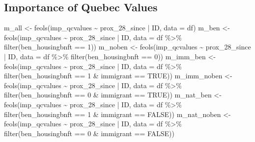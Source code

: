 \documentclass[
  letterpaper,
  DIV=11,
  numbers=noendperiod]{scrartcl}
\newenvironment{Shaded}{\begin{snugshade}}{\end{snugshade}}
\newcommand{\AttributeTok}[1]{\textcolor[rgb]{0.40,0.45,0.13}{#1}}
\newcommand{\ConstantTok}[1]{\textcolor[rgb]{0.56,0.35,0.01}{#1}}
\newcommand{\DecValTok}[1]{\textcolor[rgb]{0.68,0.00,0.00}{#1}}
\newcommand{\FunctionTok}[1]{\textcolor[rgb]{0.28,0.35,0.67}{#1}}
\newcommand{\NormalTok}[1]{\textcolor[rgb]{0.00,0.23,0.31}{#1}}
\newcommand{\OtherTok}[1]{\textcolor[rgb]{0.00,0.23,0.31}{#1}}
\newcommand{\SpecialCharTok}[1]{\textcolor[rgb]{0.37,0.37,0.37}{#1}}
\begin{document}
\hypertarget{importance-of-quebec-values-1}{%
\subsection{Importance of Quebec
Values}\label{importance-of-quebec-values-1}}

\begin{Shaded}
\begin{Highlighting}[]
\NormalTok{m\_all }\OtherTok{\textless{}{-}} \FunctionTok{feols}\NormalTok{(imp\_qcvalues }\SpecialCharTok{\textasciitilde{}}\NormalTok{ prox\_28\_since }\SpecialCharTok{|}\NormalTok{ ID, }\AttributeTok{data =}\NormalTok{ df)}
\NormalTok{m\_ben }\OtherTok{\textless{}{-}} \FunctionTok{feols}\NormalTok{(imp\_qcvalues }\SpecialCharTok{\textasciitilde{}}\NormalTok{ prox\_28\_since }\SpecialCharTok{|}\NormalTok{ ID,}
               \AttributeTok{data =}\NormalTok{ df }\SpecialCharTok{\%\textgreater{}\%} \FunctionTok{filter}\NormalTok{(ben\_housingbnft }\SpecialCharTok{==} \DecValTok{1}\NormalTok{))}
\NormalTok{m\_noben }\OtherTok{\textless{}{-}} \FunctionTok{feols}\NormalTok{(imp\_qcvalues }\SpecialCharTok{\textasciitilde{}}\NormalTok{ prox\_28\_since }\SpecialCharTok{|}\NormalTok{ ID,}
                 \AttributeTok{data =}\NormalTok{ df }\SpecialCharTok{\%\textgreater{}\%} \FunctionTok{filter}\NormalTok{(ben\_housingbnft }\SpecialCharTok{==} \DecValTok{0}\NormalTok{))}
\NormalTok{m\_imm\_ben }\OtherTok{\textless{}{-}} \FunctionTok{feols}\NormalTok{(imp\_qcvalues }\SpecialCharTok{\textasciitilde{}}\NormalTok{ prox\_28\_since }\SpecialCharTok{|}\NormalTok{ ID,}
                   \AttributeTok{data =}\NormalTok{ df }\SpecialCharTok{\%\textgreater{}\%} \FunctionTok{filter}\NormalTok{(ben\_housingbnft }\SpecialCharTok{==} \DecValTok{1} \SpecialCharTok{\&}\NormalTok{ immigrant }\SpecialCharTok{==} \ConstantTok{TRUE}\NormalTok{))}
\NormalTok{m\_imm\_noben }\OtherTok{\textless{}{-}} \FunctionTok{feols}\NormalTok{(imp\_qcvalues }\SpecialCharTok{\textasciitilde{}}\NormalTok{ prox\_28\_since }\SpecialCharTok{|}\NormalTok{ ID,}
                     \AttributeTok{data =}\NormalTok{ df }\SpecialCharTok{\%\textgreater{}\%} \FunctionTok{filter}\NormalTok{(ben\_housingbnft }\SpecialCharTok{==} \DecValTok{0} \SpecialCharTok{\&}\NormalTok{ immigrant }\SpecialCharTok{==} \ConstantTok{TRUE}\NormalTok{))}
\NormalTok{m\_nat\_ben }\OtherTok{\textless{}{-}} \FunctionTok{feols}\NormalTok{(imp\_qcvalues }\SpecialCharTok{\textasciitilde{}}\NormalTok{ prox\_28\_since }\SpecialCharTok{|}\NormalTok{ ID,}
                   \AttributeTok{data =}\NormalTok{ df }\SpecialCharTok{\%\textgreater{}\%} \FunctionTok{filter}\NormalTok{(ben\_housingbnft }\SpecialCharTok{==} \DecValTok{1} \SpecialCharTok{\&}\NormalTok{ immigrant }\SpecialCharTok{==} \ConstantTok{FALSE}\NormalTok{))}
\NormalTok{m\_nat\_noben }\OtherTok{\textless{}{-}} \FunctionTok{feols}\NormalTok{(imp\_qcvalues }\SpecialCharTok{\textasciitilde{}}\NormalTok{ prox\_28\_since }\SpecialCharTok{|}\NormalTok{ ID,}
                     \AttributeTok{data =}\NormalTok{ df }\SpecialCharTok{\%\textgreater{}\%} \FunctionTok{filter}\NormalTok{(ben\_housingbnft }\SpecialCharTok{==} \DecValTok{0} \SpecialCharTok{\&}\NormalTok{ immigrant }\SpecialCharTok{==} \ConstantTok{FALSE}\NormalTok{))}


\end{Highlighting}
\end{Shaded}
\end{document}
